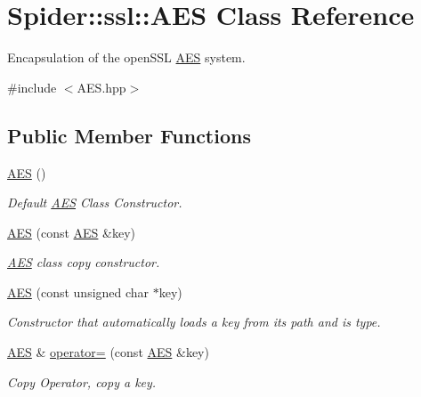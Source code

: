 \hypertarget{class_spider_1_1ssl_1_1_a_e_s}{}\section{Spider\+:\+:ssl\+:\+:A\+ES Class Reference}
\label{class_spider_1_1ssl_1_1_a_e_s}


Encapsulation of the open\+S\+SL \hyperlink{class_spider_1_1ssl_1_1_a_e_s}{A\+ES} system.  




{\ttfamily \#include $<$A\+E\+S.\+hpp$>$}

\subsection*{Public Member Functions}
\begin{DoxyCompactItemize}
\item 
\mbox{\label{class_spider_1_1ssl_1_1_a_e_s_a8eaa642dde56e252f2a88428fc3964af}} 
\hyperlink{class_spider_1_1ssl_1_1_a_e_s_a8eaa642dde56e252f2a88428fc3964af}{A\+ES} ()
\begin{DoxyCompactList}\small\item\em Default \hyperlink{class_spider_1_1ssl_1_1_a_e_s}{A\+ES} Class Constructor. \end{DoxyCompactList}\item 
\hyperlink{class_spider_1_1ssl_1_1_a_e_s_a9da7fa808bebcdb3042322a371473069}{A\+ES} (const \hyperlink{class_spider_1_1ssl_1_1_a_e_s}{A\+ES} \&key)
\begin{DoxyCompactList}\small\item\em \hyperlink{class_spider_1_1ssl_1_1_a_e_s}{A\+ES} class copy constructor. \end{DoxyCompactList}\item 
\hyperlink{class_spider_1_1ssl_1_1_a_e_s_ae588c5d1794e8cbe1cc74cf4ffc8b276}{A\+ES} (const unsigned char $\ast$key)
\begin{DoxyCompactList}\small\item\em Constructor that automatically loads a key from its path and is type. \end{DoxyCompactList}\item 
\hyperlink{class_spider_1_1ssl_1_1_a_e_s}{A\+ES} \& \hyperlink{class_spider_1_1ssl_1_1_a_e_s_a46a15236249277adc1b4b1961985d2bf}{operator=} (const \hyperlink{class_spider_1_1ssl_1_1_a_e_s}{A\+ES} \&key)
\begin{DoxyCompactList}\small\item\em Copy Operator, copy a key. \end{DoxyCompactList}\item 

\end{DoxyCompactItemize}
